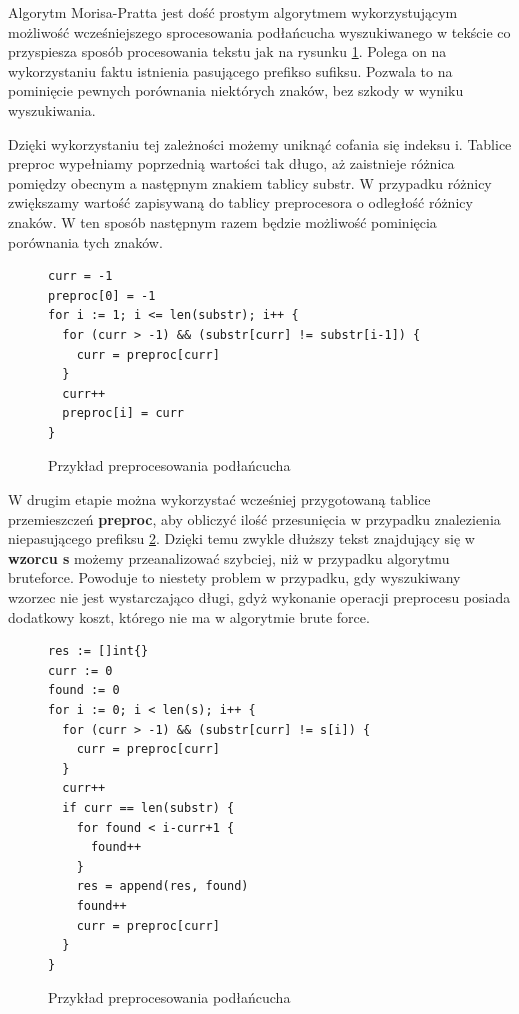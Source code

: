 Algorytm Morisa-Pratta jest dość prostym algorytmem wykorzystującym możliwość
wcześniejszego sprocesowania podłańcucha wyszukiwanego w tekście co przyspiesza
sposób procesowania tekstu jak na rysunku \ref{fig:code:preprocessMorisPratt}.
Polega on na wykorzystaniu faktu istnienia pasującego prefikso sufiksu.
Pozwala to na pominięcie pewnych porównania niektórych znaków, bez szkody w
wyniku wyszukiwania.

Dzięki wykorzystaniu tej zależności możemy uniknąć cofania się indeksu i. 
Tablice preproc wypełniamy poprzednią wartości tak długo, aż zaistnieje różnica 
pomiędzy obecnym a następnym znakiem tablicy substr. W przypadku różnicy 
zwiększamy wartość zapisywaną do tablicy preprocesora o odległość różnicy znaków.
W ten sposób następnym razem będzie możliwość pominięcia porównania tych znaków.

\begin{figure}[h]
  \centering
  \begin{lstlisting}
curr = -1
preproc[0] = -1
for i := 1; i <= len(substr); i++ {
  for (curr > -1) && (substr[curr] != substr[i-1]) {
    curr = preproc[curr]
  }
  curr++
  preproc[i] = curr
}
  \end{lstlisting}
  \caption{Przykład preprocesowania podłańcucha}
  \label{fig:code:preprocessMorisPratt}
\end{figure}

W drugim etapie można wykorzystać wcześniej przygotowaną tablice przemieszczeń 
\textbf{preproc}, aby obliczyć ilość przesunięcia w przypadku znalezienia 
niepasującego prefiksu \ref{fig:code:algoMorisPratt}. Dzięki temu zwykle dłuższy tekst znajdujący się w 
\textbf{wzorcu s} możemy przeanalizować szybciej, niż w przypadku algorytmu 
bruteforce. Powoduje to niestety problem w przypadku, gdy wyszukiwany wzorzec
nie jest wystarczająco długi, gdyż wykonanie operacji preprocesu posiada 
dodatkowy koszt, którego nie ma w algorytmie brute force.

\begin{figure}[h]
  \centering
  \begin{lstlisting}
res := []int{}
curr := 0
found := 0
for i := 0; i < len(s); i++ {
  for (curr > -1) && (substr[curr] != s[i]) {
    curr = preproc[curr]
  }
  curr++
  if curr == len(substr) {
    for found < i-curr+1 {
      found++
    }
    res = append(res, found)
    found++
    curr = preproc[curr]
  }
}
  \end{lstlisting}
  \caption{Przykład preprocesowania podłańcucha }
  \label{fig:code:algoMorisPratt}
\end{figure}

